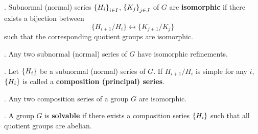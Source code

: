 . Subnormal (normal) series \(\left\{ H_i \right\}_{i \in I}\), \(\left\{ K_j \right\}_{j \in J}\) of \(G\) are \textbf{isomorphic} if there exists a bijection between
\[
    \{H_{i+1} / H_i\} \longleftrightarrow \{K_{j+1} / K_j\}
\]
such that the corresponding quotient groups are isomorphic.

\thm.  Any two subnormal (normal) series of \(G\) have isomorphic refinements.

. Let \(\left\{ H_i \right\}\) be a subnormal (normal) series of \(G\). If \(H_{i+1}/H_i\) is simple for any \(i\), \(\left\{ H_i \right\}\) is called a \textbf{composition (principal) series}.

\thm.  Any two composition series of a group \(G\) are isomorphic.

.  A group \(G\) is \textbf{solvable} if there exists a composition series \(\left\{ H_i \right\}\) such that all quotient groups are abelian.

\pagebreak
